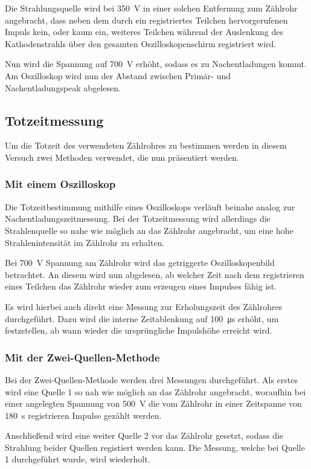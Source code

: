 Die Strahlungsquelle wird bei \SI{350}{\volt} in einer solchen Entfernung zum Zählrohr 
angebracht, dass neben dem durch ein registriertes Teilchen hervorgerufenen Impuls 
kein, oder kaum ein, weiteres Teilchen während der Auslenkung des Kathodenstrahls 
über den gesamten Oszilloskopenschirm registriert wird.

Nun wird die Spannung auf \SI{700}{\volt} erhöht, sodass es zu Nachentladungen kommt.
Am Oszilloskop wird nun der Abstand zwischen Primär- und Nachentladungspeak abgelesen.
%
\subsection{Totzeitmessung}
Um die Totzeit des verwendeten Zählrohres zu bestimmen werden in diesem Versuch 
zwei Methoden verwendet, die nun präsentiert werden.
\subsubsection{Mit einem Oszilloskop}
%
Die Totzeitbestimmung mithilfe eines Oszilloskops verläuft beinahe analog zur 
Nachentladungszeitmessung. Bei der Totzeitmessung wird allerdings die 
Strahlenquelle so nahe wie möglich an das Zählrohr angebracht, um eine hohe 
Strahlenintensität im Zählrohr zu erhalten. 

Bei \SI{700}{\volt} Spannung am Zählrohr wird das getriggerte Oszilloskopenbild 
betrachtet. An diesem wird nun abgelesen, ab welcher Zeit nach dem registrieren 
eines Teilchen das Zählrohr wieder zum erzeugen eines Impulses fähig ist.

Es wird hierbei auch direkt eine Messung zur Erholungszeit des Zählrohres durchgeführt. 
Dazu wird die interne Zeitablenkung auf \SI{100}{\micro\second} erhöht, um festzstellen, 
ab wann wieder die ursprüngliche Impulshöhe erreicht wird.
%
\subsubsection{Mit der Zwei-Quellen-Methode}
%
Bei der Zwei-Quellen-Methode werden drei Messungen durchgeführt.
Als erstes wird eine Quelle 1 so nah wie möglich an das Zählrohr angebracht, 
woraufhin bei einer angelegten Spannung von \SI{500}{\volt} die vom 
Zählrohr in einer Zeitspanne von \SI{180}{\second} registrieren Impulse 
gezählt werden.

Anschließend wird eine weiter Quelle 2 vor das Zählrohr gesetzt, sodass die 
Strahlung beider Quellen registiert werden kann. Die Messung, welche bei 
Quelle 1 durchgeführt wurde, wird wiederholt.


